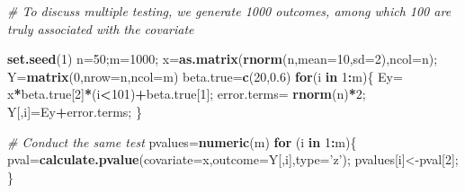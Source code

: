 \documentclass[12pt,]{book}
\newenvironment{Shaded}{\begin{snugshade}}{\end{snugshade}}
\newcommand{\KeywordTok}[1]{\textcolor[rgb]{0.13,0.29,0.53}{\textbf{#1}}}
\newcommand{\DataTypeTok}[1]{\textcolor[rgb]{0.13,0.29,0.53}{#1}}
\newcommand{\DecValTok}[1]{\textcolor[rgb]{0.00,0.00,0.81}{#1}}
\newcommand{\FloatTok}[1]{\textcolor[rgb]{0.00,0.00,0.81}{#1}}
\newcommand{\StringTok}[1]{\textcolor[rgb]{0.31,0.60,0.02}{#1}}
\newcommand{\CommentTok}[1]{\textcolor[rgb]{0.56,0.35,0.01}{\textit{#1}}}
\newcommand{\ControlFlowTok}[1]{\textcolor[rgb]{0.13,0.29,0.53}{\textbf{#1}}}
\newcommand{\OperatorTok}[1]{\textcolor[rgb]{0.81,0.36,0.00}{\textbf{#1}}}
\newcommand{\NormalTok}[1]{#1}
\begin{document}
\begin{Shaded}
\begin{Highlighting}[]
\CommentTok{# To discuss multiple testing, we generate 1000 outcomes, among which 100 are truly associated with the covariate }

\KeywordTok{set.seed}\NormalTok{(}\DecValTok{1}\NormalTok{)}
\NormalTok{n=}\DecValTok{50}\NormalTok{;m=}\DecValTok{1000}\NormalTok{;}
\NormalTok{x=}\KeywordTok{as.matrix}\NormalTok{(}\KeywordTok{rnorm}\NormalTok{(n,}\DataTypeTok{mean=}\DecValTok{10}\NormalTok{,}\DataTypeTok{sd=}\DecValTok{2}\NormalTok{),}\DataTypeTok{ncol=}\NormalTok{n);}
\NormalTok{Y=}\KeywordTok{matrix}\NormalTok{(}\DecValTok{0}\NormalTok{,}\DataTypeTok{nrow=}\NormalTok{n,}\DataTypeTok{ncol=}\NormalTok{m)}
\NormalTok{beta.true=}\KeywordTok{c}\NormalTok{(}\DecValTok{20}\NormalTok{,}\FloatTok{0.6}\NormalTok{)}
\ControlFlowTok{for}\NormalTok{(i }\ControlFlowTok{in} \DecValTok{1}\OperatorTok{:}\NormalTok{m)\{}
\NormalTok{Ey=}\StringTok{ }\NormalTok{x}\OperatorTok{*}\NormalTok{beta.true[}\DecValTok{2}\NormalTok{]}\OperatorTok{*}\NormalTok{(i}\OperatorTok{<}\DecValTok{101}\NormalTok{)}\OperatorTok{+}\NormalTok{beta.true[}\DecValTok{1}\NormalTok{];}
\NormalTok{error.terms=}\StringTok{ }\KeywordTok{rnorm}\NormalTok{(n)}\OperatorTok{*}\DecValTok{2}\NormalTok{;  }
\NormalTok{Y[,i]=Ey}\OperatorTok{+}\NormalTok{error.terms;}
\NormalTok{\}}

\CommentTok{# Conduct the same test }
\NormalTok{pvalues=}\KeywordTok{numeric}\NormalTok{(m)}
\ControlFlowTok{for}\NormalTok{ (i }\ControlFlowTok{in} \DecValTok{1}\OperatorTok{:}\NormalTok{m)\{}
\NormalTok{  pval=}\KeywordTok{calculate.pvalue}\NormalTok{(}\DataTypeTok{covariate=}\NormalTok{x,}\DataTypeTok{outcome=}\NormalTok{Y[,i],}\DataTypeTok{type=}\StringTok{'z'}\NormalTok{);}
\NormalTok{  pvalues[i]<-pval[}\DecValTok{2}\NormalTok{];}
\NormalTok{\}}
\end{Highlighting}
\end{Shaded}
\end{document}
